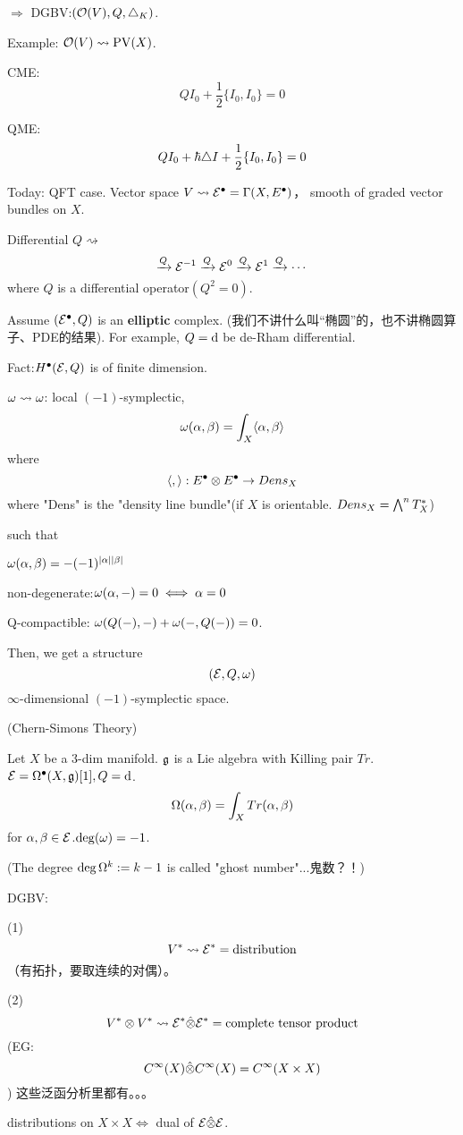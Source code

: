 $\Rightarrow$ DGBV:$(\mathcal{O}(V),Q,\triangle_K)$.

Example: $\mathcal{O}(V)\rightsquigarrow\operatorname{PV}(X)$.

CME:
$$QI_0+\frac{1}{2}\{I_0,I_0\}=0$$

QME:
$$QI_0+\hbar\triangle I+\frac{1}{2}\{I_0,I_0\}=0$$

Today: QFT case.
Vector space $V\rightsquigarrow\mathcal{E}^{\bullet}=\Gamma(X,E^{\bullet})$，
smooth of graded vector bundles on $X$.

Differential $Q\rightsquigarrow$
$$\xrightarrow{Q}\mathcal{E}^{-1}\xrightarrow{Q}\mathcal{E}^{0}\xrightarrow{Q}\mathcal{E}^{1}\xrightarrow{Q}\cdots$$
where $Q$ is a differential operator$(Q^2=0)$.

Assume $(\mathcal{E}^{\bullet},Q)$ is an \textbf{elliptic} complex.
(我们不讲什么叫“椭圆”的，也不讲椭圆算子、PDE的结果).
For example, $Q=\mathrm{d}$ be de-Rham differential.

Fact:$H^{\bullet}(\mathcal{E},Q)$ is of finite dimension.

$\omega\rightsquigarrow\omega$: local $(-1)$-symplectic,
$$\omega(\alpha,\beta)=\int_X\langle\alpha,\beta\rangle$$
where
$$\langle,\rangle: E^{\bullet}\otimes E^{\bullet}\to Dens_X$$
where "Dens" is the "density line bundle"(if $X$ is orientable. $Dens_X=\bigwedge\nolimits^{n}T_X^*$)

such that

$\omega(\alpha,\beta)=-(-1)^{|\alpha||\beta|}$

non-degenerate:$\omega(\alpha,-)=0\iff\alpha=0$

Q-compactible:
$\omega(Q(-),-)+\omega(-,Q(-))=0$.

Then, we get a structure
$$(\mathcal{E},Q,\omega)$$
$\infty$-dimensional $(-1)$-symplectic space.

\begin{example}(Chern-Simons Theory)

Let $X$ be a $3$-dim manifold. $\mathfrak{g}$ is a Lie algebra
with Killing pair $Tr$. $\mathcal{E}=\Omega^{\bullet}(X,\mathfrak{g})[1],Q=\mathrm{d}$.
$$\Omega(\alpha,\beta)=\int_XTr(\alpha,\beta)$$
for $\alpha,\beta\in\mathcal{E}$.$\deg(\omega)=-1$.
\end{example}
(The degree $\deg\Omega^k:=k-1$ is called "ghost number"...鬼数？！)

DGBV:

(1)
$$V^*\rightsquigarrow\mathcal{E}^*=\text{distribution}$$
（有拓扑，要取连续的对偶）。

(2)
$$V^*\otimes V^*\rightsquigarrow\mathcal{E}^*\hat{\otimes}\mathcal{E}^*=\text{complete tensor product}$$
(EG:$$C^\infty(X)\hat{\otimes}C^\infty(X)=C^{\infty}(X\times X)$$
)
这些泛函分析里都有。。。

distributions on $X\times X\iff$ dual of $\mathcal{E}\hat{\otimes}\mathcal{E}$.

